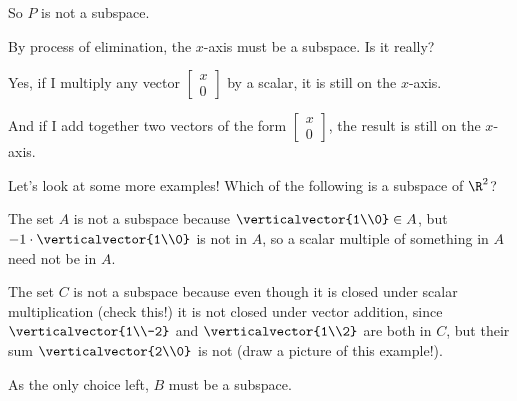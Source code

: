 \documentclass{ximera}
\begin{document}
\begin{question}
\begin{solution}
    \begin{hint}
      So $P$ is not a subspace.
    \end{hint}

    \begin{hint}
      By process of elimination, the $x$-axis must be a subspace.  Is it really?
    \end{hint}

    \begin{hint}
      Yes, if I multiply any vector $\begin{bmatrix} x \\ 0 \end{bmatrix}$ by a scalar, it is still on the $x$-axis.
    \end{hint}

    \begin{hint}
      And if I add together two vectors of the form $\begin{bmatrix} x \\ 0 \end{bmatrix}$, the result is still on the $x$-axis.
    \end{hint}

    \begin{multiple-choice}
    \end{multiple-choice}
  \end{solution}
  
  Let's look at some more examples!  Which of the following is a subspace of $\R^2$?
  \begin{solution}
    \begin{hint}
      The set $A$ is not a subspace because $\verticalvector{1\\0} \in A$, but $-1 \cdot \verticalvector{1\\0}$ is not in $A$, so a scalar multiple of something in $A$ need not be in $A$.
    \end{hint}
    \begin{hint}
      The set $C$ is not a subspace because even though it is closed
      under scalar multiplication (check this!) it is not closed under
      vector addition, since $\verticalvector{1\\-2}$ and
      $\verticalvector{1\\2}$ are both in $C$, but their sum
      $\verticalvector{2\\0}$ is not (draw a picture of this
      example!).
    \end{hint}
    \begin{hint}
      As the only choice left, $B$ must be a subspace.


\end{hint}
\end{solution}
\end{question}
\end{document}
